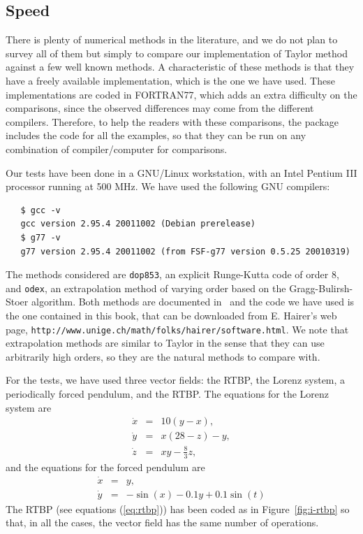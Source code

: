 \documentclass[12pt,twoside]{article}
\begin{document}
\subsection{Speed}\label{sec:sc}
There is plenty of numerical methods in the literature, and we do not
plan to survey all of them but simply to compare our implementation of
Taylor method against a few well known methods. A characteristic of
these methods is that they have a freely available implementation,
which is the one we have used. These implementations are coded in
FORTRAN77, which adds an extra difficulty on the comparisons, since
the observed differences may come from the different compilers.
Therefore, to help the readers with these comparisons, the package
includes the code for all the examples, so that they can be run on any
combination of compiler/computer for comparisons.

Our tests have been done in a GNU/Linux workstation, with an Intel
Pentium III processor running at 500 MHz. We have used the following
GNU compilers:
\begin{verbatim}
   $ gcc -v
   gcc version 2.95.4 20011002 (Debian prerelease)
   $ g77 -v
   g77 version 2.95.4 20011002 (from FSF-g77 version 0.5.25 20010319)
\end{verbatim}

The methods considered are \texttt{dop853}, an explicit Runge-Kutta
code of order 8, and \texttt{odex}, an extrapolation method of varying
order based on the Gragg-Bulirsh-Stoer algorithm. Both methods are
documented in~\cite{HairerNW00} and the code we have used is the one
contained in this book, that can be downloaded from E. Hairer's web
page, \texttt{http://www.unige.ch/math/folks/hairer/software.html}.
We note that extrapolation methods are similar to Taylor in the sense
that they can use arbitrarily high orders, so they are the natural
methods to compare with.

For the tests, we have used three vector fields: the RTBP, the Lorenz
system, a periodically forced pendulum, and the RTBP.
The equations for the Lorenz system are
\begin{eqnarray*}
\dot{x} & = & 10(y-x),\\
\dot{y} & = & x(28-z)-y,\\
\dot{z} & = & xy-\frac{8}{3}z,
\end{eqnarray*}
and the equations for the forced pendulum are
\begin{eqnarray*}
\dot{x} & = & y,\\
\dot{y} & = &-\sin(x)-0.1y+0.1\sin(t)
\end{eqnarray*}
The RTBP (see equations (\ref{eq:rtbp})) has been coded as in
Figure~\ref{fig:i-rtbp} so that, in all the cases, the vector field
has the same number of operations.
\end{document}
